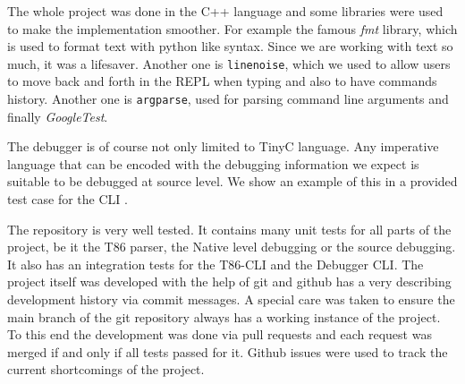 The whole project was done in the C++ language and some libraries were used to
make the implementation smoother. For example the famous \textit{fmt}
 library, which is used to format text with python like syntax.
Since we are working with text so much, it was a lifesaver. Another one is
\texttt{linenoise}, which we used to allow users to move back and forth in the
REPL when typing and also to have commands history. Another one is
\texttt{argparse}, used for parsing command line arguments and finally
\textit{GoogleTest}.

The debugger is of course not only limited to TinyC language. Any imperative
language that can be encoded with the debugging information we expect is
suitable to be debugged at source level. We show an example of this in a
provided test case for the CLI .

The repository is very well tested. It contains many unit tests for all parts
of the project, be it the T86 parser, the Native level debugging or the source
debugging. It also has an integration tests for the T86-CLI and the Debugger
CLI. The project itself was developed with the help of git and github has a
very describing development history via commit messages. A special care was
taken to ensure the main branch of the git repository always has a working
instance of the project. To this end the development was done via pull requests
and each request was merged if and only if all tests passed for it. Github issues
were used to track the current shortcomings of the project.

